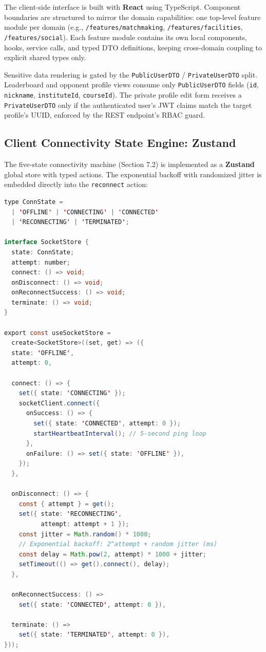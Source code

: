 \documentclass[11pt,a4paper]{report}
\begin{document}
The client-side interface is built with \textbf{React} using TypeScript. Component boundaries are structured to mirror the domain capabilities: one top-level feature module per domain (e.g., \texttt{/features/matchmaking}, \texttt{/features/facilities}, \texttt{/features/social}). Each feature module contains its own local components, hooks, service calls, and typed DTO definitions, keeping cross-domain coupling to explicit shared types only.

Sensitive data rendering is gated by the \texttt{PublicUserDTO} / \texttt{PrivateUserDTO} split. Leaderboard and opponent profile views consume only \texttt{PublicUserDTO} fields (\texttt{id}, \texttt{nickname}, \texttt{instituteId}, \texttt{courseId}). The private profile edit form receives a \texttt{PrivateUserDTO} only if the authenticated user's JWT claims match the target profile's UUID, enforced by the REST endpoint's RBAC guard.

\subsection{Client Connectivity State Engine: Zustand}

The five-state connectivity machine (Section 7.2) is implemented as a \textbf{Zustand} global store with typed actions. The exponential backoff with randomized jitter is embedded directly into the \texttt{reconnect} action:

\begin{lstlisting}[language=Java, caption={Zustand connectivity state machine with jitter backoff}]
type ConnState =
  | 'OFFLINE' | 'CONNECTING' | 'CONNECTED'
  | 'RECONNECTING' | 'TERMINATED';

interface SocketStore {
  state: ConnState;
  attempt: number;
  connect: () => void;
  onDisconnect: () => void;
  onReconnectSuccess: () => void;
  terminate: () => void;
}

export const useSocketStore =
  create<SocketStore>((set, get) => ({
  state: 'OFFLINE',
  attempt: 0,

  connect: () => {
    set({ state: 'CONNECTING' });
    socketClient.connect({
      onSuccess: () => {
        set({ state: 'CONNECTED', attempt: 0 });
        startHeartbeatInterval(); // 5-second ping loop
      },
      onFailure: () => set({ state: 'OFFLINE' }),
    });
  },

  onDisconnect: () => {
    const { attempt } = get();
    set({ state: 'RECONNECTING',
          attempt: attempt + 1 });
    const jitter = Math.random() * 1000;
    // Exponential backoff: 2^attempt + random jitter (ms)
    const delay = Math.pow(2, attempt) * 1000 + jitter;
    setTimeout(() => get().connect(), delay);
  },

  onReconnectSuccess: () =>
    set({ state: 'CONNECTED', attempt: 0 }),

  terminate: () =>
    set({ state: 'TERMINATED', attempt: 0 }),
}));
\end{lstlisting}
\end{document}
